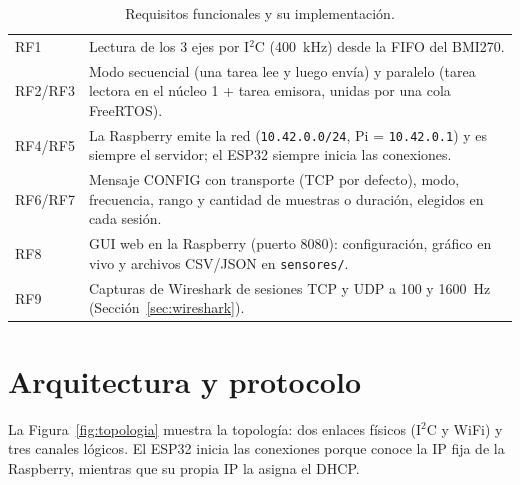 \documentclass[11pt,a4paper]{report}
\begin{document}
\begin{table}[h]
\centering\small
\caption{Requisitos funcionales y su implementación.}\label{tab:rf}
\begin{tabularx}{\textwidth}{@{}lX@{}}
\toprule
RF1 & Lectura de los 3 ejes por I$^2$C (400~kHz) desde la FIFO del BMI270. \\
RF2/RF3 & Modo secuencial (una tarea lee y luego envía) y paralelo (tarea lectora en el núcleo 1 + tarea emisora, unidas por una cola FreeRTOS). \\
RF4/RF5 & La Raspberry emite la red (\texttt{10.42.0.0/24}, Pi = \texttt{10.42.0.1}) y es siempre el servidor; el ESP32 siempre inicia las conexiones. \\
RF6/RF7 & Mensaje CONFIG con transporte (TCP por defecto), modo, frecuencia, rango y cantidad de muestras o duración, elegidos en cada sesión. \\
RF8 & GUI web en la Raspberry (puerto 8080): configuración, gráfico en vivo y archivos CSV/JSON en \texttt{sensores/}. \\
RF9 & Capturas de Wireshark de sesiones TCP y UDP a 100 y 1600~Hz (Sección~\ref{sec:wireshark}). \\ \bottomrule
\end{tabularx}
\end{table}

\chapter{Arquitectura y protocolo}\label{cap:arquitectura}
La Figura~\ref{fig:topologia} muestra la topología: dos enlaces físicos (I$^2$C y WiFi) y tres canales lógicos. El ESP32 inicia las conexiones porque conoce la IP fija de la Raspberry, mientras que su propia IP la asigna el DHCP.
\end{document}
